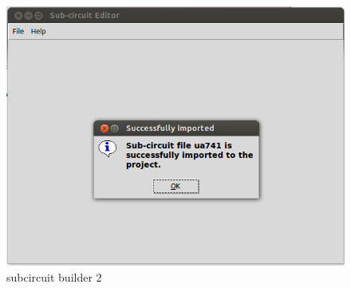 \begin{enumerate}
\begin{figure}%
\begin{center}
\includegraphics[width=1\linewidth]{figures/apd22.png}%
\caption{subcircuit builder 2}
\label{22}
\end{center}
\end{figure}


\end{enumerate}
